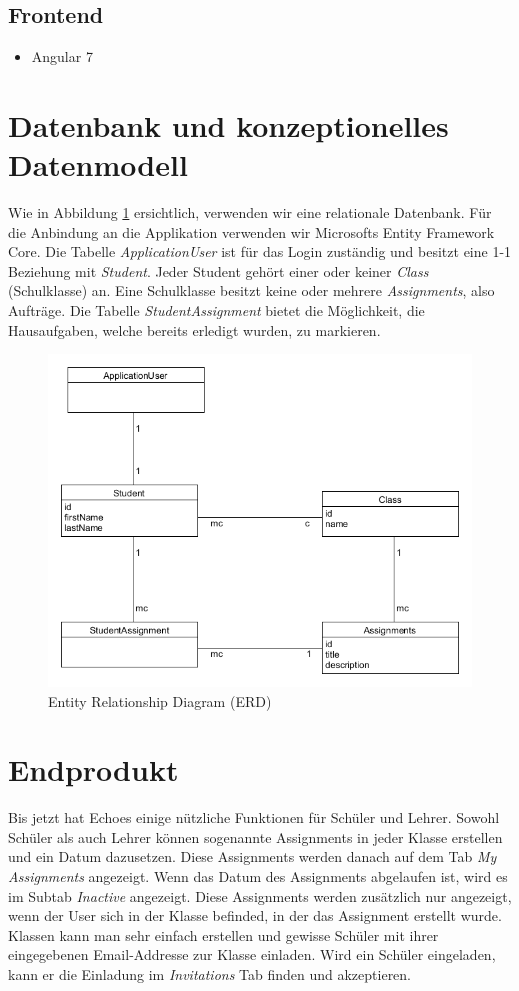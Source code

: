 \documentclass[a4paper, titlepage]{article}
\begin{document}
    \subsection{Frontend}
    \begin{itemize}
    \item Angular 7
    \end{itemize}

    \section{Datenbank und konzeptionelles Datenmodell}
    Wie in Abbildung \ref{erd} ersichtlich, verwenden wir eine relationale Datenbank. Für die Anbindung an die Applikation
    verwenden wir Microsofts Entity Framework Core. Die Tabelle \emph{ApplicationUser}
    ist für das Login zuständig und besitzt eine 1-1 Beziehung mit \emph{Student}.
    Jeder Student gehört einer oder keiner \emph{Class} (Schulklasse) an. Eine Schulklasse besitzt
    keine oder mehrere \emph{Assignments}, also Aufträge. Die Tabelle \emph{StudentAssignment}
    bietet die Möglichkeit, die Hausaufgaben, welche bereits erledigt wurden,
    zu markieren.
    \begin{figure}
        \includegraphics[width=\textwidth]{uml}
        \caption{Entity Relationship Diagram (ERD)}
        \label{erd}
    \end{figure}
    \section{Endprodukt}
    Bis jetzt hat Echoes einige nützliche Funktionen für Schüler und Lehrer. Sowohl Schüler als auch Lehrer können sogenannte Assignments in jeder Klasse erstellen und ein Datum dazusetzen. Diese Assignments werden danach auf dem Tab \emph{My Assignments} angezeigt. Wenn das Datum des Assignments abgelaufen ist, wird es im Subtab \emph{Inactive} angezeigt. Diese Assignments werden zusätzlich nur angezeigt, wenn der User sich in der Klasse befinded, in der das Assignment erstellt wurde. Klassen kann man sehr einfach erstellen und gewisse Schüler mit ihrer eingegebenen Email-Addresse zur Klasse einladen. Wird ein Schüler eingeladen, kann er die Einladung im \emph{Invitations} Tab finden und akzeptieren.
    
\end{document}
